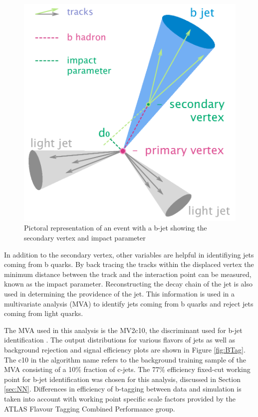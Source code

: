 \begin{figure}[h!]
	\centering
	\includegraphics[width=.5\columnwidth]{../ThesisImages/Simulation/B-tagging_diagram.png}
	\caption[Pictoral representation of an event with a b-jet showing the secondary vertex and impact parameter]{Pictoral representation of an event with a b-jet showing the secondary vertex and impact parameter \cite{BTagImg} 
	}
	\label{fig:BTagVars}
\end{figure}

In addition to the secondary vertex, other variables are helpful in identifiying jets coming from b quarks.  By back tracing the tracks within the displaced vertex the minimum distance between the track and the interaction point can be measured, known as the impact parameter.  Reconstructing the decay chain of the jet is also used in determining the providence of the jet.  This information is used in a multivariate analysis (MVA) to identify jets coming from b quarks and reject jets coming from light quarks.

The MVA used in this analysis is the MV2c10, the discriminant used for b-jet identification \cite{BJet1718}.  The output distributions for various flavors of jets as well as background rejection and signal efficiency plots are shown in Figure \ref{fig:BTag}.  The c10 in the algorithm name refers to the background training sample of the MVA consisting of a 10\% fraction of c-jets.  The 77\% efficiency fixed-cut working point for b-jet identification was chosen for this analysis, discussed in Section \ref{sec:NN}.  Differences in efficiency of b-tagging between data and simulation is taken into account with working point specific scale factors provided by the ATLAS Flavour Tagging Combined Performance group.

